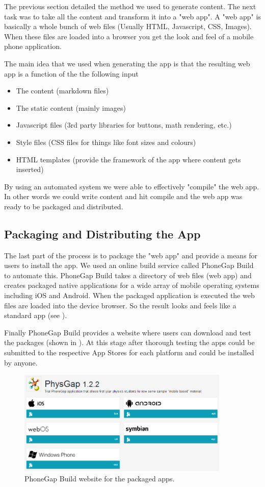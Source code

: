 \documentclass[12pt,a4paper]{article}  %
\begin{document}
The previous section detailed the method we used to generate content. The next task was to take all the content and transform it into a "web app". A "web app" is basically a whole bunch of web files (Usually HTML, Javascript, CSS, Images). When these files are loaded into a browser you get the look and feel of a mobile phone application. 

The main idea that we used when generating the app is that the resulting web app is a function of the the following input
\begin{itemize}
\item The content (markdown files)
\item The static content (mainly images)
\item Javascript files (3rd party libraries for buttons, math rendering, etc.)
\item Style files (CSS files for things like font sizes and colours)
\item HTML templates (provide the framework of the app where content gets inserted)
\end{itemize}

By using an automated system we were able to effectively "compile" the web app. In other words we could write content and hit compile and the web app was ready to be packaged and distributed.

\subsection{Packaging and Distributing the App}

The last part of the process is to package the "web app" and provide a means for users to install the app. We used an online build service called PhoneGap Build \cite{phonegap} to automate this. PhoneGap Build takes a directory of web files (web app) and creates packaged native applications for a wide array of mobile operating systems including iOS and Android. When the packaged application is executed the web files are loaded into the device browser. So the result looks and feels like a standard app (see ).

Finally PhoneGap Build provides a website where users can download and test the packages (shown in ). At this stage after thorough testing the apps could be submitted to the respective App Stores for each platform and could be installed by anyone.

\begin{figure}[htb]
\centering
\includegraphics[width=0.9\textwidth]{phonegap.png}
\caption{PhoneGap Build website for the packaged apps.}
\label{fig:pg}
\end{figure}
\end{document}
